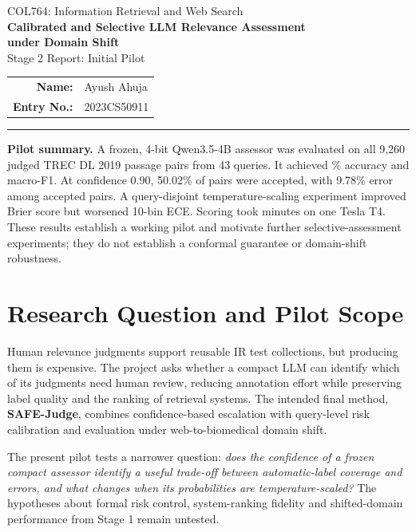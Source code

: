 \documentclass[11pt,a4paper]{article}
\begin{document}
\begin{center}
{\small COL764: Information Retrieval and Web Search}\\[4pt]
{\Large\bfseries Calibrated and Selective LLM Relevance Assessment\\[2pt] under Domain Shift}\\[6pt]
{\large Stage 2 Report: Initial Pilot}\\[8pt]
\begin{tabular}{rl}
\textbf{Name:} & Ayush Ahuja \\
\textbf{Entry No.:} & 2023CS50911 \\
\end{tabular}
\end{center}
\vspace{-2pt}\hrule\vspace{6pt}

\textbf{Pilot summary.} A frozen, 4-bit Qwen3.5-4B assessor was evaluated on all
9,260 judged TREC DL 2019 passage pairs from 43 queries. It achieved
\PilotAccuracy\% accuracy and \PilotFone{} macro-F1. At confidence 0.90,
50.02\% of pairs were accepted, with 9.78\% error among accepted pairs. A
query-disjoint temperature-scaling experiment improved Brier score but worsened
10-bin ECE. Scoring took \PilotScoreMinutes{} minutes on one Tesla T4.
These results establish a working pilot and motivate further selective-assessment
experiments; they do not establish a conformal guarantee or domain-shift robustness.

\section{Research Question and Pilot Scope}
Human relevance judgments support reusable IR test collections, but producing them
is expensive. The project asks whether a compact LLM can identify which of its
judgments need human review, reducing annotation effort while preserving label
quality and the ranking of retrieval systems. The intended final method,
\textbf{SAFE-Judge}, combines confidence-based escalation with query-level risk
calibration and evaluation under web-to-biomedical domain shift.

The present pilot tests a narrower question: \emph{does the confidence of a frozen
compact assessor identify a useful trade-off between automatic-label coverage and
errors, and what changes when its probabilities are temperature-scaled?}
The hypotheses about formal risk control, system-ranking fidelity and shifted-domain
performance from Stage 1 remain untested.
\end{document}
